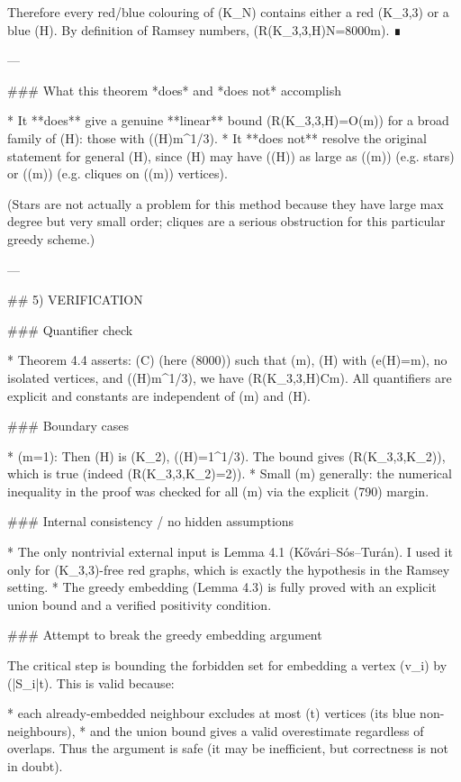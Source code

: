 Therefore every red/blue colouring of (K_N) contains either a red (K_{3,3}) or a blue (H). By definition of Ramsey numbers, (R(K_{3,3},H)\le N=8000m). ∎

---

### What this theorem *does* and *does not* accomplish

* It **does** give a genuine **linear** bound (R(K_{3,3},H)=O(m)) for a broad family of (H): those with (\Delta(H)\le m^{1/3}).
* It **does not** resolve the original statement for general (H), since (H) may have (\Delta(H)) as large as (\Theta(m)) (e.g. stars) or (\Theta(\sqrt m)) (e.g. cliques on (\Theta(\sqrt m)) vertices).

(Stars are not actually a problem for this method because they have large max degree but very small order; cliques are a serious obstruction for this particular greedy scheme.)

---

## 5) VERIFICATION

### Quantifier check

* Theorem 4.4 asserts: (\exists C) (here (8000)) such that (\forall m), (\forall H) with (e(H)=m), no isolated vertices, and (\Delta(H)\le m^{1/3}), we have (R(K_{3,3},H)\le Cm).
  All quantifiers are explicit and constants are independent of (m) and (H).

### Boundary cases

* (m=1): Then (H) is (K_2), (\Delta(H)=1^{1/3}). The bound gives (R(K_{3,3},K_2)), which is true (indeed (R(K_{3,3},K_2)=2)).
* Small (m) generally: the numerical inequality in the proof was checked for all (m) via the explicit (790) margin.

### Internal consistency / no hidden assumptions

* The only nontrivial external input is Lemma 4.1 (Kővári–Sós–Turán). I used it only for (K_{3,3})-free red graphs, which is exactly the hypothesis in the Ramsey setting.
* The greedy embedding (Lemma 4.3) is fully proved with an explicit union bound and a verified positivity condition.

### Attempt to break the greedy embedding argument

The critical step is bounding the forbidden set for embedding a vertex (v_i) by (|S_i|t). This is valid because:

* each already-embedded neighbour excludes at most (t) vertices (its blue non-neighbours),
* and the union bound gives a valid overestimate regardless of overlaps.
  Thus the argument is safe (it may be inefficient, but correctness is not in doubt).

